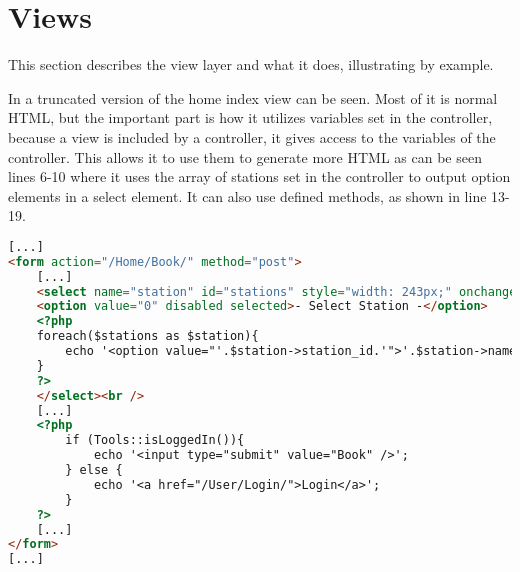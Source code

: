 \section{Views}
This section describes the view layer and what it does, illustrating by example.

In  a truncated version of the home index view can be seen. 
Most of it is normal HTML, but the important part is how it utilizes variables set in the controller, because a view is included by a controller, it gives access to the variables of the controller. 
This allows it to use them to generate more HTML as can be seen lines 6-10 where it uses the array of stations set in the controller to output option elements in a select element.
It can also use defined methods, as shown in line 13-19.

\begin{lstlisting}[language=html, label=lst:homeIndexView, caption={Home Index View}]
[...]
<form action="/Home/Book/" method="post">
    [...]
    <select name="station" id="stations" style="width: 243px;" onchange="UpdateMarker()">
    <option value="0" disabled selected>- Select Station -</option>
    <?php
    foreach($stations as $station){
        echo '<option value="'.$station->station_id.'">'.$station->name.'</option>';
    }
    ?>
    </select><br />
    [...]
    <?php
        if (Tools::isLoggedIn()){
            echo '<input type="submit" value="Book" />';
        } else {
            echo '<a href="/User/Login/">Login</a>';
        }
    ?>
    [...]
</form>
[...]
\end{lstlisting}
